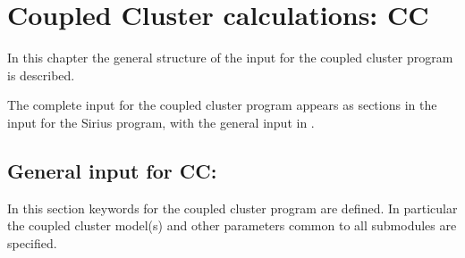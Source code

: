 \chapter{Coupled Cluster calculations: CC}
\label{chap:ccgeneral}

In this chapter the general structure of the input for the 
coupled cluster program is described.

The complete input for the coupled cluster program appears as
sections in the input for the Sirius program, with the general
input in . 

\section{General input for CC: }\label{sec:ccgeneral}

In this section keywords for the coupled
cluster program are defined. In particular the coupled cluster 
model(s) and other parameters common to all submodules are specified.

